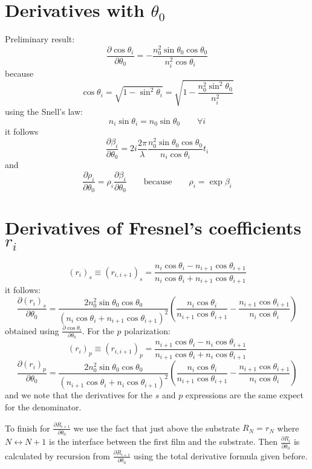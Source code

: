 \documentclass{article}
\newcommand\pder[2]{\frac{\partial #1}{\partial #2}}
\begin{document}
\section{Derivatives with $\theta_0$}
Preliminary result:
\begin{equation}
    \pder{\cos \theta_i}{\theta_0} = - \frac{n_0^2 \sin \theta_0 \cos \theta_0}{n_i^2 \cos \theta_i}
\end{equation}
because
\begin{equation*}
    \cos \theta_i = \sqrt{1 - \sin^2 \theta_i} = \sqrt{1 - \frac{n_0^2 \sin^2 \theta_0}{n_i^2}}
\end{equation*}
using the Snell's law:
\begin{equation*}
    n_i \sin \theta_i = n_0 \sin \theta_0 \qquad \forall i
\end{equation*}
it follows
\begin{equation}
    \pder{\beta_i}{\theta_0} = 2 i \frac{2 \pi}{\lambda} \frac{n_0^2 \sin \theta_0 \cos \theta_0}{n_i \cos \theta_i} t_i
\end{equation}
and
\begin{equation}
    \pder{\rho_i}{\theta_0} = \rho_i \pder{\beta_i}{\theta_0} \qquad \textrm{because} \qquad \rho_i = \exp \beta_i
\end{equation}
\section{Derivatives of Fresnel's coefficients $r_i$}
\begin{equation}
    ( r_i )_s \equiv ( r_{i,i+1} )_s = \frac{n_{i} \cos \theta_{i} - n_{i+1} \cos \theta_{i+1}}{n_{i} \cos \theta_{i} + n_{i+1} \cos \theta_{i+1}}
\end{equation}
it follows:
\begin{equation}
    \pder{( r_i )_s}{\theta_0} = \frac{2 n_0^2 \sin \theta_0 \cos \theta_0}{\left(n_{i} \cos \theta_{i} + n_{i+1} \cos \theta_{i+1}\right)^2} \left( \frac{n_{i} \cos \theta_{i}}{n_{i+1} \cos \theta_{i+1}} - \frac{n_{i+1} \cos \theta_{i+1}}{n_{i} \cos \theta_{i}}\right)
\end{equation}
obtained using $\pder{\cos \theta_i}{\theta_0}$. For the $p$ polarization:
\begin{equation}
    ( r_i )_p \equiv ( r_{i,i+1} )_p = \frac{n_{i+1} \cos \theta_{i} - n_{i} \cos \theta_{i+1}}{n_{i+1} \cos \theta_{i} + n_{i} \cos \theta_{i+1}}
\end{equation}
\begin{equation}
    \pder{( r_i )_p}{\theta_0} = \frac{2 n_0^2 \sin \theta_0 \cos \theta_0}{\left(n_{i+1} \cos \theta_{i} + n_{i} \cos \theta_{i+1}\right)^2} \left( \frac{n_{i} \cos \theta_{i}}{n_{i+1} \cos \theta_{i+1}} - \frac{n_{i+1} \cos \theta_{i+1}}{n_{i} \cos \theta_{i}}\right)
\end{equation}
and we note that the derivatives for the $s$ and $p$ expressions are the same expect for the denominator.

To finish for $\pder{R_{i+1}}{\theta_0}$ we use the fact that just above the substrate $R_N = r_N$ where $N \leftrightarrow N+1$ is the interface between the first film and the substrate. Then $\pder{R_{i}}{\theta_0}$ is calculated by recursion from $\pder{R_{i+1}}{\theta_0}$ using the total derivative formula given before.
\end{document}
